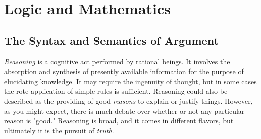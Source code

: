 
\toclineskip
\section{Logic and Mathematics}

\vspace{4mm}
\vspace{3mm}





\subsection{The Syntax and Semantics of Argument}

\textit{Reasoning} is a cognitive act performed by rational beings. It involves the absorption and synthesis of presently available information for the purpose of elucidating knowledge. It may require the ingenuity of thought, but in some cases the rote application of simple rules is sufficient. Reasoning could also be described as the providing of good \textit{reasons} to explain or justify things. However, as you might expect, there is much debate over whether or not any particular reason is "good." Reasoning is broad, and it comes in different flavors, but ultimately it is the pursuit of \textit{truth}. \\

